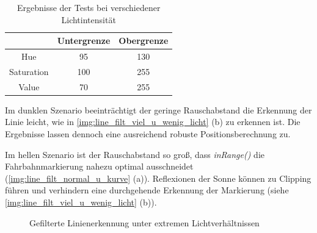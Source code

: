\documentclass[12pt, a4paper]{scrartcl}
\begin{document}
\begin{table}[h]
	\caption{Ergebnisse der Tests bei verschiedener Lichtintensität}
	\centering
	\begin{tabular}{ c | c | c |}
		& Untergrenze & Obergrenze \\ \hline
		Hue & 95 & 130 \\ \hline
		Saturation & 100 & 255 \\ \hline
		Value & 70 & 255 \\
	\end{tabular}
	\label{tbl:linedet_lighttest}
\end{table}

Im dunklen Szenario beeinträchtigt der geringe Rauschabstand die Erkennung der Linie leicht, wie in \autoref{img:line_filt_viel_u_wenig_licht} (b) zu erkennen ist. Die Ergebnisse lassen dennoch eine ausreichend robuste Positionsberechnung zu.

Im hellen Szenario ist der Rauschabstand so groß, dass \emph{inRange()} die Fahrbahnmarkierung nahezu optimal ausschneidet (\autoref{img:line_filt_normal_u_kurve} (a)). Reflexionen der Sonne können zu Clipping führen und verhindern eine durchgehende Erkennung der Markierung (siehe \autoref{img:line_filt_viel_u_wenig_licht} (b)).

\begin{figure}[h]
	\caption{Gefilterte Linienerkennung unter extremen Lichtverhältnissen}
	\label{img:line_filt_viel_u_wenig_licht}
\end{figure}
\end{document}
